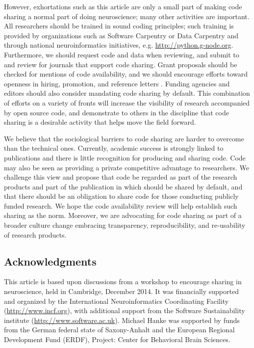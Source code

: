 \documentclass[11pt]{article}
\begin{document}
However, exhortations such as this article are only a small part of
making code sharing a normal part of doing neuroscience; many other
activities are important.  All researchers should be trained in sound
coding principles; such training is provided by organizations such as
Software Carpentry \cite{wilson_best_2014} or Data Carpentry and
through national neuroinformatics initiatives,
e.g. \url{http://python.g-node.org}.  Furthermore, we should request
code and data when reviewing, and submit to and review for journals
that support code sharing.  Grant proposals should be checked for
mentions of code availability, and we should encourage efforts toward
openness in hiring, promotion, and reference letters
\cite{leveque2012reproducible}. Funding agencies and editors should
also consider mandating code sharing by default.  This combination of
efforts on a variety of fronts will increase the visibility of
research accompanied by open source code, and demonstrate to others in
the discipline that code sharing is a desirable activity that helps
move the field forward.

We believe that the sociological barriers to code sharing are harder
to overcome than the technical ones. Currently, academic success is
strongly linked to publications and there is little recognition for
producing and sharing code. Code may also be seen as providing a
private competitive advantage to researchers. We challenge this view
and propose that code be regarded as part of the research products and
part of the publication in which should be shared by default, and that
there should be an obligation to share code for those conducting
publicly funded research. We hope the code availability review
\cite{nn2017ed} will help establish such sharing as the norm.
Moreover, we are advocating for code sharing as part of a broader
culture change embracing transparency, reproducibility, and
re-usability of research products.

\subsection*{Acknowledgments}

This article is based upon discussions from a workshop to encourage
sharing in neuroscience, held in Cambridge, December 2014.  It was
financially supported and organized by the International
Neuroinformatics Coordinating Facility (\url{http://www.incf.org}),
with additional support from the Software Sustainability institute
(\url{http://www.software.ac.uk}).
%
Michael Hanke was supported by funds from the German federal state of
Saxony-Anhalt and the European Regional Development Fund (ERDF), Project:
Center for Behavioral Brain Sciences.
\end{document}
